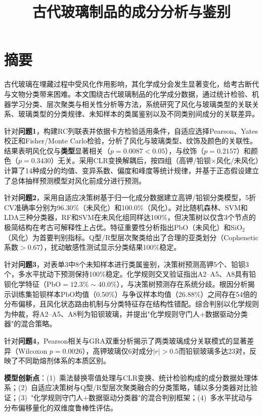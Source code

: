 \documentclass[12pt,a4paper]{ctexart}
\title{\vspace{-2cm}\textbf{古代玻璃制品的成分分析与鉴别}}
\author{}
\date{}
\begin{document}
\maketitle
\thispagestyle{empty}

\section*{摘\quad 要}
\thispagestyle{fancy}

古代玻璃在埋藏过程中受风化作用影响，其化学成分会发生显著变化，给考古断代与文物分类带来困难。本文围绕古代玻璃制品的化学成分数据，通过统计检验、机器学习分类、层次聚类与相关性分析等方法，系统研究了风化与玻璃类型的关联关系、玻璃类型的分类规律、未知样本的类属鉴别以及不同类别间成分的关联差异。

针对\textbf{问题1}，构建RC列联表并依据卡方检验适用条件，自适应选择Pearson、Yates校正和Fisher/Monte Carlo检验，分析了风化与玻璃类型、纹饰及颜色的关联性。结果表明风化仅与\textbf{类型}显著相关（$p=0.0087<0.05$），与纹饰（$p=0.2157$）和颜色（$p=0.3430$）无关。采用CLR变换解耦后，按四组（高钾/铅钡$\times$风化/未风化）计算了14种成分的均值、变异系数、偏度和峰度等统计规律，并基于正态假设建立了总体抽样预测模型对风化前成分进行预测。

针对\textbf{问题2}，采用自适应决策树基于归一化成分数据建立高钾/铅钡分类模型，5折CV准确率分别为96.30\%（未风化）和100.0\%（风化）。对比随机森林、SVM和LDA三种分类器，RF和SVM在未风化组同样达100\%，但决策树以仅含3个节点的极简结构在考古可解释性上占优。特征重要性分析指出PbO（未风化）和SiO$_2$（风化）为首要判别指标。Q型/R型层次聚类给出了合理的亚类划分（Cophenetic系数$>0.67$），扰动敏感性测试显示分类结果100\%稳定。

针对\textbf{问题3}，对表单3中8个未知样本进行类属鉴别，决策树预测高钾5个、铅钡3个，多水平扰动下预测保持100\%稳定。化学规则交叉验证指出A2--A5、A8具有铅钡化学特征（PbO$=12.3\%\sim40.0\%$），与决策树预测存在系统分歧。根因分析揭示训练集铅钡样本PbO均值（0.50\%）与争议样本均值（26.88\%）之间存在54倍的分布偏移，且风化状态路由机制与分类特征存在结构性错配。综合判别以化学规则为仲裁，将A2--A5、A8判为铅钡玻璃，并提出"化学规则守门人+数据驱动分类器"的混合策略。

针对\textbf{问题4}，Pearson相关与GRA双重分析揭示了两类玻璃成分关联模式的显著差异（Wilcoxon $p=0.0026$），高钾玻璃仅6对成分$|r|>0.5$而铅钡玻璃多达23对，反映了不同助熔剂体系的本质区别。

\textbf{模型创新点}：(1)~乘法替换零值处理与CLR变换、统计检验构成的成分数据处理体系；(2)~自适应决策树与Q型/R型层次聚类融合的分类策略，辅以多分类器对比验证；(3)~"化学规则守门人+数据驱动分类器"的混合判别框架；(4)~多水平扰动与分布偏移量化的双维度鲁棒性评估。
\end{document}
